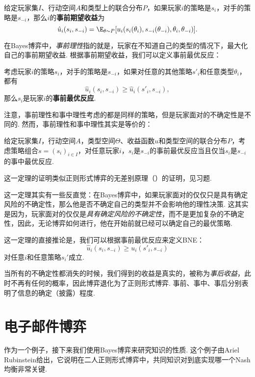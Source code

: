 \begin{definition}[事前期望收益]
    给定玩家集$I$、行动空间$A$和类型上的联合分布$P$，如果玩家$i$的策略是$s_i$，对手的策略是$s_{-i}$，那么$i$的\textbf{事前期望收益}为
\[\hat u_i(s_i,s_{-i})=\E_{\theta\sim P}[u_i(s_i(\theta_i),s_{-i}(\theta_{-i}),\theta_i,\theta_{-i})].\]
\end{definition}

在Bayes博弈中，\emph{事前理性}指的就是，玩家在不知道自己的类型的情况下，最大化自己的事前期望收益. 根据事前期望收益，我们可以定义事前最优反应：

\begin{definition}[事前最优反应]
    考虑玩家$i$的策略$s_i$，对手的策略是$s_{-i}$，如果对任意的其他策略$s'_i$和任意类型$\theta_i$，都有
    \[\hat u_i(s_i,s_{-i})\geq \hat u_i(s'_i,s_{-i}),\]
    那么$s_i$是玩家$i$的\textbf{事前最优反应}.
\end{definition}

注意，事前理性和事中理性考虑的都是同样的策略，但是玩家面对的不确定性是不同的. 然而，事前理性和事中理性其实是等价的：

\begin{theorem}
    给定玩家集$I，$行动空间$A$，类型空间$\Theta$、收益函数$u$和类型空间的联合分布$P$，考虑策略组合$s=(s_i)_{i\in I}$，对任意玩家$i$，$s_i$是$s_{-i}$的事前最优反应当且仅当$s_i$是$s_{-i}$的事中最优反应.
\end{theorem}
这一定理的证明类似正则形式博弈的无差别原理（）的证明，见习题.

这一定理其实有一些反直觉：在Bayes博弈中，如果玩家面对的仅仅只是具有确定风险的不确定性，那么他是否不确定自己的类型并不会影响他的理性决策. 这其实是因为，玩家面对的仅仅是\emph{具有确定风险的不确定性}，而不是更加复杂的不确定性，因此，无论博弈如何进行，他在开始前就已经可以确定自己的最优策略.

这一定理的直接推论是，我们可以根据事前最优反应来定义BNE：
     \[\hat u_i(s_i,s_{-i})\geq u_i(s'_i,s_{-i})\]
对任意$i$和任意策略$s_i'$成立.

当所有的不确定性都消失的时候，我们得到的收益是真实的，被称为\emph{事后收益}，此时不再有任何的概率，因此博弈退化为了正则形式博弈. 事前、事中、事后分别表明了信息的确定（披露）程度. 

\section{电子邮件博弈}\label{sec:emailing-game}

作为一个例子，接下来我们使用Bayes博弈来研究知识的性质. 这个例子由Ariel Rubinstein给出，它说明在二人正则形式博弈中，共同知识对到底实现哪一个Nash均衡非常关键.

